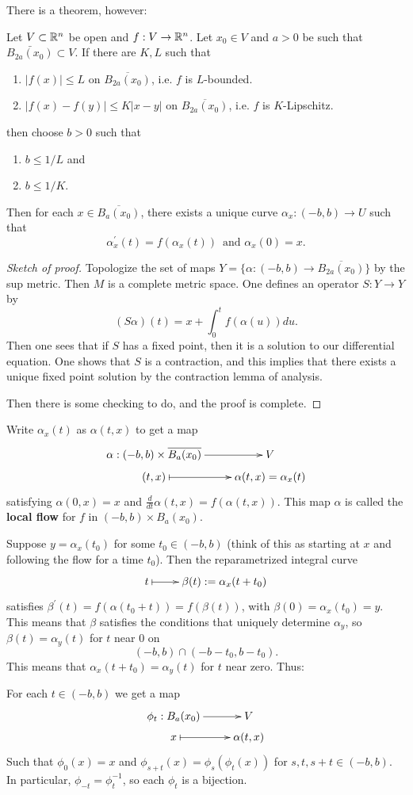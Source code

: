 \documentclass[11pt, english]{article}
\begin{document}
There is a theorem, however:
\begin{thm}
Let $V \subset \mathbb{R}^n$ be open and $f:V \to \mathbb{R}^n$. Let $x_0 \in V$ and $a > 0$ be such that $\bar{B_{2a}(x_0)} \subset V$. If there are $K,L$ such that 
\begin{enumerate}
\item $|f(x)| \leq L$ on $\overline{B_{2a}(x_0)}$, i.e. $f$ is $L$-bounded.
\item $|f(x)-f(y)| \leq K|x-y|$ on $\overline{B_{2a}(x_0)}$, i.e. $f$ is $K$-Lipschitz.
\setcounter{enumTemp}{\theenumi}
\end{enumerate}
then choose $b > 0$ such that
\begin{enumerate}
\setcounter{enumi}{\theenumTemp}
\item $b \leq 1/L$ and 
\item $b \leq 1/K$. 
\end{enumerate}
Then for each $x \in \overline{B_a(x_0)}$, there exists a unique curve $\alpha_x:(-b,b) \to U$ such that
\[
\alpha_x^\prime(t) = f(\alpha_x(t)) \, \text{ and } \alpha_x(0)=x.
\]
\end{thm}
\begin{proof}[Sketch of proof] Topologize the set of maps $Y= \{ \alpha:(-b,b) \to \overline{B_{2a}(x_0)}\}$ by the sup metric. Then $M$ is a complete metric space. One defines an operator $S:Y\to Y$ by 
\[
(S\alpha)(t) = x + \int_0^t f(\alpha(u)) du.
\]
Then one sees that if $S$ has a fixed point, then it is a solution to our differential equation. One shows that $S$ is a contraction, and this implies that there exists a unique fixed point solution by the contraction lemma of analysis.

Then there is some checking to do, and the proof is complete.
\end{proof}

Write $\alpha_x(t)$ as $\alpha(t,x)$ to get a map
\[
\xymatrix@R=3pt{
\alpha:(-b,b) \times \overline{B_a(x_0)} \ar[r] & V \\
(t, x ) \ar@{|->}[r] & \alpha(t,x)=\alpha_x(t)
}
\]
satisfying $\alpha(0,x)=x$ and $\frac{d}{dt} \alpha(t,x) = f(\alpha(t,x))$. This map $\alpha$ is called the \textbf{local flow} for $f$ in $(-b,b) \times B_a(x_0)$.

Suppose $y=\alpha_x(t_0)$ for some $t_0 \in (-b,b)$ (think of this as starting at $x$ and following the flow for a time $t_0$). Then the reparametrized integral curve
\[
\xymatrix@R=3pt{
t \ar@{|->}[r] & \beta(t) := \alpha_x(t+t_0)
}
\]
satisfies $\beta^\prime(t)= f(\alpha(t_0+t))=f(\beta(t))$, with $\beta(0)=\alpha_x(t_0)=y$. This means that $\beta$ satisfies the conditions that uniquely determine $\alpha_y$, so $\beta(t)=\alpha_y(t)$ for $t$ near $0$ on 
\[
(-b,b) \cap (-b-t_0, b-t_0).
\]
This means that $\alpha_x(t+t_0)=\alpha_y(t)$ for $t$ near zero. Thus:
\begin{prop}
For each $t \in (-b,b)$ we get a map
\[
\xymatrix@R=3pt{
\phi_t:B_a(x_0) \ar[r]& V \\
x \ar@{|->}[r] & \alpha(t,x)
}
\]
Such that $\phi_0(x)=x$ and $\phi_{s+t}(x)=\phi_s(\phi_t(x))$ for $s,t,s+t \in (-b,b)$. In particular, $\phi_{-t}=\phi_t^{-1}$, so each $\phi_t$ is a bijection.
\end{prop}
\end{document}
